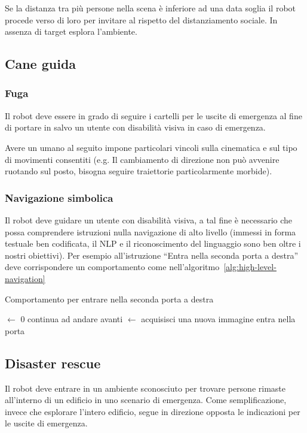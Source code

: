 \documentclass[a4paper]{article}
\begin{document}
	Se la distanza tra più persone nella scena è inferiore ad una data soglia il robot procede verso di loro per invitare al rispetto del distanziamento sociale. In assenza di target esplora l'ambiente.

	\subsection{Cane guida}\label{subsec:Cane-guida}
	\subsubsection{Fuga}\label{subsubsec:Fuga}
	Il robot deve essere in grado di seguire i cartelli per le uscite di emergenza al fine di portare in salvo un utente con disabilità visiva in caso di emergenza.

	Avere un umano al seguito impone particolari vincoli sulla cinematica e sul tipo di movimenti consentiti (e.g. Il cambiamento di direzione non può avvenire ruotando sul posto, bisogna seguire traiettorie particolarmente morbide).
	\subsubsection{Navigazione simbolica}\label{subsubsec:Navigazione-simbolica}
	Il robot deve guidare un utente con disabilità visiva, a tal fine è necessario che possa comprendere istruzioni nulla navigazione di alto livello (immessi in forma testuale ben codificata, il NLP e il riconoscimento del linguaggio sono ben oltre i nostri obiettivi). Per esempio all'istruzione ``Entra nella seconda porta a destra'' deve corrispondere un comportamento come nell'algoritmo~\ref{alg:high-level-navigation}

	\begin{algorithm}[H]
	\caption{Comportamento per entrare nella seconda porta a destra}\label{alg:high-level-navigation}
		\DontPrintSemicolon
		\SetAlgoLined
		\Porte $\gets$ 0\;
		 {
			continua ad andare avanti\;
			\img $\gets$ acquisisci una nuova immagine\;
		}
		entra nella porta\;
	\end{algorithm}

	\subsection{Disaster rescue}\label{subsec:Disaster-rescue}
	Il robot deve entrare in un ambiente sconosciuto per trovare persone rimaste all'interno di un edificio in uno scenario di emergenza. Come semplificazione, invece che esplorare l'intero edificio, segue in direzione opposta le indicazioni per le uscite di emergenza.
\end{document}
